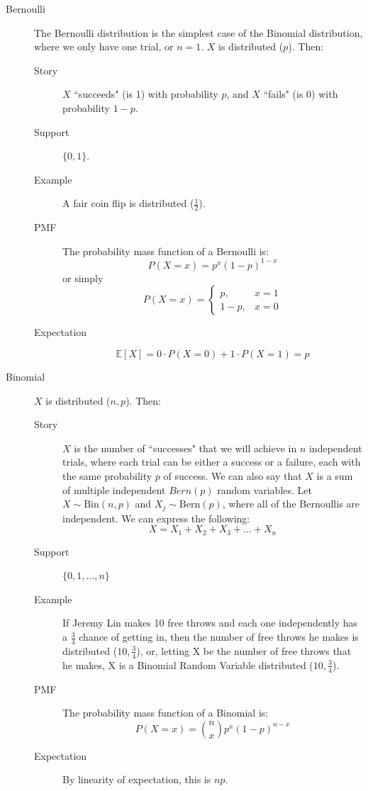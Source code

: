 \documentclass[11pt]{article}
\theoremstyle{definition}
\theoremstyle{remark}
\newcommand{\Bin}{\text{Bin}}
\newcommand{\Bern}{\text{Bern}}
\newcommand{\E}[1]{\mathbb{E}\left[ #1 \right]}
\begin{document}
\begin{description}
\item[Bernoulli] The Bernoulli distribution is the simplest case of the Binomial distribution, where we only have one trial, or $n=1$. $X$ is distributed \Bern($p$). Then:
\begin{description}
	\item[Story] $X$ ``succeeds" (is 1) with probability $p$, and $X$ ``fails" (is 0) with probability $1-p$.
	\item[Support] $\{0,1\}$.
	\item[Example] A fair coin flip is distributed \Bern($\frac{1}{2}$).
	\item[PMF] The probability mass function of a Bernoulli is:
\[P(X = x) = p^x(1-p)^{1-x}\]
or simply
\[P(X = x) = \begin{cases} p, & x = 1 \\ 1-p, & x = 0 \end{cases}\]
    \item[Expectation]
    $$ \E{X} = 0 \cdot P(X = 0) + 1 \cdot P(X=1) = p$$
\end{description}

\item[Binomial] $X$ is distributed \Bin($n,p$). Then:
\begin{description}
	\item[Story] $X$ is the number of ``successes" that we will achieve in $n$ independent trials, where each trial can be either a success or a failure, each with the same probability $p$ of success. We can also say that $X$ is a sum of multiple independent $Bern(p)$ random variables. Let $X \sim \Bin(n, p)$ and $X_j \sim \Bern(p)$, where all of the Bernoullis are independent. We can express the following:
	\[X = X_1 + X_2 + X_3 + \dots + X_n\]
	\item[Support] $\{0,1,\ldots,n\}$
	\item[Example] If Jeremy Lin makes 10 free throws and each one independently has a $\frac{3}{4}$ chance of getting in, then the number of free throws he makes is distributed  \Bin($10,\frac{3}{4}$), or, letting X be the number of free throws that he makes, X is a Binomial Random Variable distributed  \Bin($10,\frac{3}{4}$).
	\item[PMF] The probability mass function of a Binomial is:
    $$P(X = x) = \binom{n}{x} p^x(1-p)^{n-x}$$
    \item[Expectation] By linearity of expectation, this is $np$.
\end{description}


\end{description}
\end{document}
